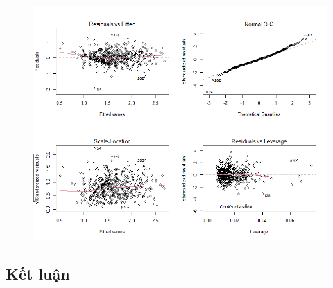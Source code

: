 \begin{figure}
	\includegraphics[width=\textwidth]{../Photo Of Result/diagnostic-plot-4}
\end{figure}

\subsection*{Kết luận}


